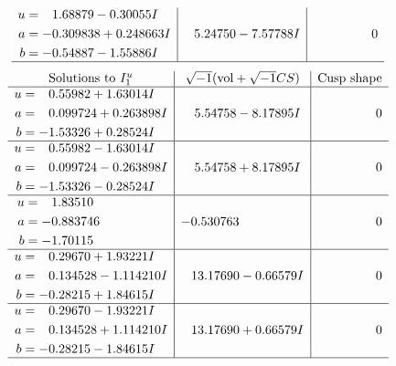 \documentclass[1p]{elsarticle_modified}
\theoremstyle{definition}
\newcommand{\I}{\sqrt{-1}}
\begin{document}
$$\begin{array}{c|c|c}
\begin{aligned}
u &= \phantom{-}1.68879 - 0.30055 I \\
a &= -0.309838 + 0.248663 I \\
b &= -0.54887 - 1.55886 I\end{aligned}
 & \phantom{-}5.24750 - 7.57788 I & \phantom{-0.000000 } 0\\
 \hline 
 \end{array}$$\newpage$$\begin{array}{c|c|c}  
\text{Solutions to }I^u_{1}& \I (\text{vol} + \sqrt{-1}CS) & \text{Cusp shape}\\
 \hline 
\begin{aligned}
u &= \phantom{-}0.55982 + 1.63014 I \\
a &= \phantom{-}0.099724 + 0.263898 I \\
b &= -1.53326 + 0.28524 I\end{aligned}
 & \phantom{-}5.54758 - 8.17895 I & \phantom{-0.000000 } 0 \\ \hline\begin{aligned}
u &= \phantom{-}0.55982 - 1.63014 I \\
a &= \phantom{-}0.099724 - 0.263898 I \\
b &= -1.53326 - 0.28524 I\end{aligned}
 & \phantom{-}5.54758 + 8.17895 I & \phantom{-0.000000 } 0 \\ \hline\begin{aligned}
u &= \phantom{-}1.83510\phantom{ +0.000000I} \\
a &= -0.883746\phantom{ +0.000000I} \\
b &= -1.70115\phantom{ +0.000000I}\end{aligned}
 & -0.530763\phantom{ +0.000000I} & \phantom{-0.000000 } 0 \\ \hline\begin{aligned}
u &= \phantom{-}0.29670 + 1.93221 I \\
a &= \phantom{-}0.134528 - 1.114210 I \\
b &= -0.28215 + 1.84615 I\end{aligned}
 & \phantom{-}13.17690 - 0.66579 I & \phantom{-0.000000 } 0 \\ \hline\begin{aligned}
u &= \phantom{-}0.29670 - 1.93221 I \\
a &= \phantom{-}0.134528 + 1.114210 I \\
b &= -0.28215 - 1.84615 I\end{aligned}
 & \phantom{-}13.17690 + 0.66579 I & \phantom{-0.000000 } 0\\
 \hline 
 \end{array}$$\newpage\newpage\renewcommand{\arraystretch}{1}
\end{document}
